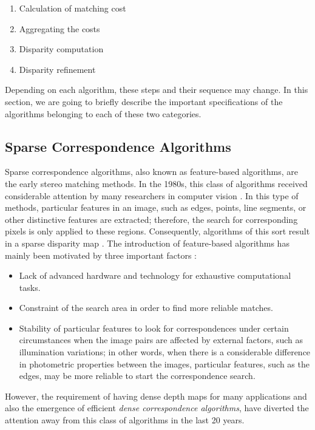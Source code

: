 \begin{enumerate}
\item {Calculation of matching cost}
\item {Aggregating the costs}
\item {Disparity computation}
\item {Disparity refinement}
\end{enumerate}
Depending on each algorithm, these steps and their sequence may change.\newline
In this section, we are going to briefly describe the important specifications of the algorithms belonging to each of these two categories.
\subsection{Sparse Correspondence Algorithms}
Sparse correspondence algorithms, also known as feature-based algorithms, are the early stereo matching methods. In the 1980s, this class of algorithms received considerable attention by
many researchers in computer vision \cite{dhon89}.
In this type of methods, particular features in an image, such as edges, 
points, line segments, or other distinctive features are extracted; therefore, the search for corresponding pixels is only applied to these regions. 
Consequently, algorithms of this
sort result in a sparse disparity map \cite{matt89,hsie92, sze11}. The introduction of feature-based algorithms has mainly been motivated by three important factors \cite{bro03,sze11}:
\begin{itemize}
\item Lack of advanced hardware and technology for exhaustive computational tasks.
\item Constraint of the search area in order to find more reliable matches.
\item Stability of particular features to look for correspondences under certain circumstances when the image pairs are affected by external factors, 
such as illumination variations; in other words, when there is a considerable difference in photometric properties between the images, 
particular features, such as the edges, may be more reliable to start the correspondence search.
\end{itemize}
\noindent
However, the requirement of having dense depth maps for many applications and also the emergence of efficient {\it dense correspondence algorithms}, have diverted the attention away
from this class of algorithms in the last 20 years.

